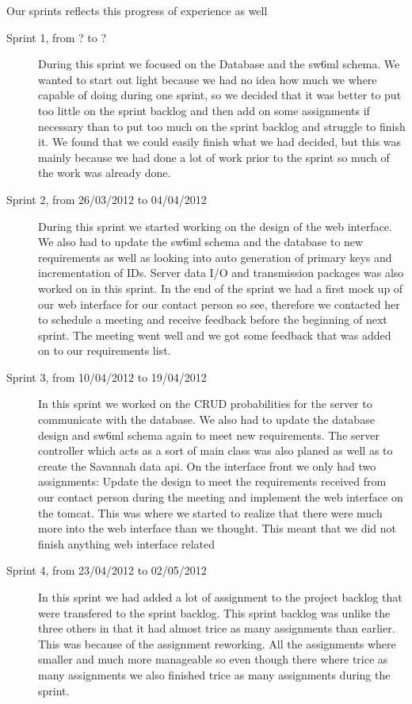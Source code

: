Our sprints reflects this progress of experience as well

\begin{description}
\item [Sprint 1, from ? to ?]
	During this sprint we focused on the Database and the sw6ml schema. We wanted to start out light because we had no idea how much we where capable of doing during one sprint, so we decided that it was better to put too little on the sprint backlog and then add on some assignments if necessary than to put too much on the sprint backlog and struggle to finish it. We found that we could easily finish what we had decided, but this was mainly because we had done a lot of work prior to the sprint so much of the work was already done.
\item[Sprint 2, from 26/03/2012 to 04/04/2012]
	During this sprint we started working on the design of the web interface. We also had to update the sw6ml schema and the database to new requirements as well as looking into auto generation of primary keys and incrementation of IDs. Server data I/O and transmission packages was also worked on in this sprint. In the end of the sprint we had a first mock up of our web interface for our contact person so see, therefore we contacted her to schedule a meeting and receive feedback before the beginning of next sprint. The meeting went well and we got some feedback that was added on to our requirements list. 
\item[Sprint 3, from 10/04/2012 to 19/04/2012]
	In this sprint we worked on the CRUD probabilities for the server to communicate with the database. We also had to update the database design and sw6ml schema again to meet new requirements. The server controller which acts as a sort of main class was also planed as well as to create the Savannah data api. On the interface front we only had two assignments: Update the design to meet the requirements received from our contact person during the meeting and implement the web interface on the tomcat. This was where we started to realize that there were much more into the web interface than we thought. This meant that we did not finish anything web interface related
\item [Sprint 4, from 23/04/2012 to 02/05/2012]
	In this sprint we had added a lot of assignment to the project backlog that were transfered to the sprint backlog. This sprint backlog was unlike the three others in that it had almost trice as many assignments than earlier. This was because of the assignment reworking. All the assignments where smaller and much more manageable so even though there where trice as many assignments we also finished trice as many assignments during the sprint.

\end{description}
